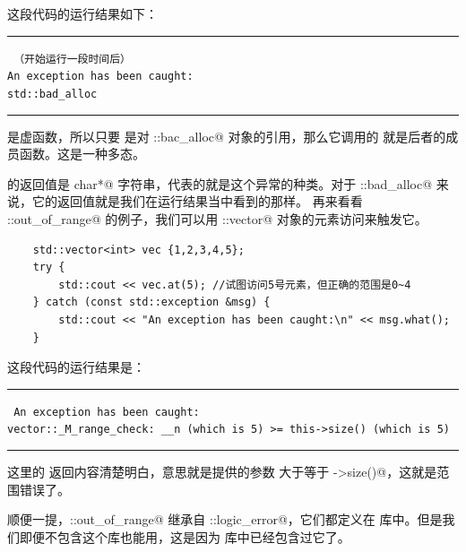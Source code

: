 这段代码的运行结果如下：\\\noindent\rule{\linewidth}{.2pt}\texttt{
{\kaishu\color{gray}（开始运行一段时间后）}\\
An exception has been caught:\\
std::bad\_alloc
}\\\noindent\rule{\linewidth}{.2pt}\par
\lstinline@what@ 是虚函数，所以只要 \lstinline@msg@ 是对 \lstinline@std::bac_alloc@ 对象的引用，那么它调用的 \lstinline@what@ 就是后者的成员函数。这是一种多态。\par
\lstinline@what@ 的返回值是 \lstinline@const char*@ 字符串，代表的就是这个异常的种类。对于 \lstinline@std::bad_alloc@ 来说，它的返回值就是我们在运行结果当中看到的那样。
再来看看 \lstinline@std::out_of_range@ 的例子，我们可以用 \lstinline@std::vector@ 对象的元素访问来触发它。
\begin{lstlisting}
    std::vector<int> vec {1,2,3,4,5};
    try {
        std::cout << vec.at(5); //试图访问5号元素，但正确的范围是0~4
    } catch (const std::exception &msg) {
        std::cout << "An exception has been caught:\n" << msg.what();
    }
\end{lstlisting}
这段代码的运行结果是：\\\noindent\rule{\linewidth}{.2pt}\texttt{
An exception has been caught:\\
vector::\_M\_range\_check: \_\_n (which is 5) >= this->size() (which is 5)
}\\\noindent\rule{\linewidth}{.2pt}\par
这里的 \lstinline@what@ 返回内容清楚明白，意思就是提供的参数 \lstinline@n@ 大于等于 \lstinline@this->size()@，这就是范围错误了。\par
顺便一提，\lstinline@std::out_of_range@ 继承自 \lstinline@std::logic_error@，它们都定义在 \lstinline@stdexcept@ 库中。但是我们即便不包含这个库也能用，这是因为 \lstinline@vector@ 库中已经包含过它了。\par
